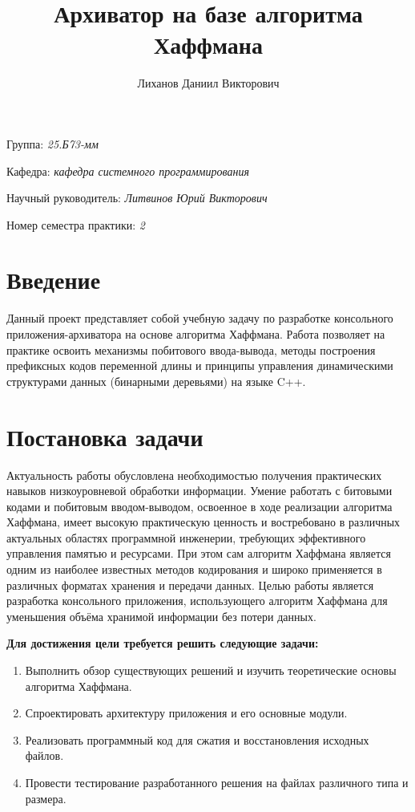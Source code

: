 \documentclass[a4paper]{article}
\title{Архиватор на базе алгоритма Хаффмана}
\author{Лиханов Даниил Викторович}
\date{}
\begin{document}
\maketitle

\begin{flushright}
    Группа: \emph{25.Б73-мм}

    Кафедра: \emph{кафедра системного программирования}

    Научный руководитель: \emph{Литвинов Юрий Викторович}

    Номер семестра практики: \emph{2}
\end{flushright}

\section{Введение}

Данный проект представляет собой учебную задачу по разработке консольного приложения-архиватора
на основе алгоритма Хаффмана. Работа позволяет на практике освоить механизмы побитового
ввода-вывода, методы построения префиксных кодов переменной длины и принципы управления
динамическими структурами данных (бинарными деревьями) на языке C++.

\section{Постановка задачи}

Актуальность работы обусловлена необходимостью получения практических навыков
низкоуровневой обработки информации. Умение работать с битовыми кодами и побитовым
вводом-выводом, освоенное в ходе реализации алгоритма Хаффмана, имеет высокую практическую
ценность и востребовано в различных актуальных областях программной инженерии, требующих
эффективного управления памятью и ресурсами. При этом сам алгоритм Хаффмана является одним
из наиболее известных методов кодирования и широко применяется в различных форматах хранения
и передачи данных. Целью работы является разработка консольного приложения, использующего
алгоритм Хаффмана для уменьшения объёма хранимой информации без потери данных.

\textbf{Для достижения цели требуется решить следующие задачи:}

\begin{enumerate}
    \item Выполнить обзор существующих решений и изучить теоретические основы алгоритма
          Хаффмана.
    \item Спроектировать архитектуру приложения и его основные модули.
    \item Реализовать программный код для сжатия и восстановления исходных файлов.
    \item Провести тестирование разработанного решения на файлах различного типа и размера.
\end{enumerate}
\end{document}
